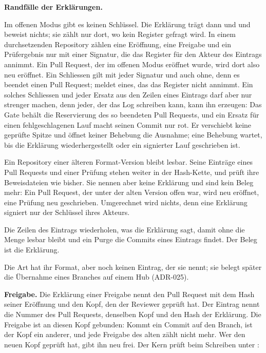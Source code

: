 \startinfobox
{\bf Randfälle der Erklärungen.}
\startitemize
\item Im offenen Modus gibt es keinen Schlüssel. Die Erklärung trägt dann  und
 und beweist nichts; sie zählt nur dort, wo kein Register gefragt wird.
In einem durchsetzenden Repository zählen eine Eröffnung, eine Freigabe und ein Prüfergebnis nur
mit einer Signatur, die das Register für den Akteur des Eintrags annimmt.
Ein Pull Request, der im offenen Modus eröffnet wurde, wird dort also neu eröffnet.
Ein Schliessen gilt mit jeder Signatur und auch ohne, denn es beendet einen Pull Request;
 meldet eines, das das Register nicht annimmt.
Ein solches Schliessen und jeder Ersatz aus den Zeilen eines Eintrags darf aber nur strenger
machen, denn jeder, der das Log schreiben kann, kann ihn erzeugen: Das Gate behält die
Reservierung des so beendeten Pull Requests, und ein Ersatz für einen fehlgeschlagenen Lauf
macht seinen Commit nur rot.
Er verschiebt keine geprüfte Spitze und öffnet keiner Behebung die Ausnahme; eine Behebung wartet,
bis die Erklärung wiederhergestellt oder ein signierter Lauf geschrieben ist.
\item Ein Repository einer älteren Format-Version bleibt lesbar. Seine Einträge eines Pull
Requests und einer Prüfung stehen weiter in der Hash-Kette, und  prüft ihre
Beweisdateien wie bisher. Sie nennen aber keine Erklärung und sind kein Beleg mehr: Ein Pull
Request, der unter der alten Version offen war, wird neu eröffnet, eine Prüfung neu geschrieben.
Umgerechnet wird nichts, denn eine Erklärung signiert nur der Schlüssel ihres Akteurs.
\item Die Zeilen des Eintrags wiederholen, was die Erklärung sagt, damit  ohne die
Menge lesbar bleibt und ein Purge die Commits eines Eintrags findet. Der Beleg ist die Erklärung.
\item Die Art  hat ihr Format, aber noch keinen Eintrag, der sie nennt;
sie belegt später die Übernahme eines Branches auf einem Hub (ADR-025).
\stopitemize
\stopinfobox

{\bf Freigabe.}
Die Erklärung einer Freigabe nennt den Pull Request mit dem Hash seiner Eröffnung und den Kopf,
den der Reviewer geprüft hat.
Der Eintrag  nennt die Nummer des Pull Requests, denselben Kopf und den Hash der
Erklärung.
Die Freigabe ist an diesen Kopf gebunden: Kommt ein Commit auf den Branch, ist der Kopf ein
anderer, und jede Freigabe des alten zählt nicht mehr.
Wer den neuen Kopf geprüft hat, gibt ihn neu frei.
Der Kern prüft beim Schreiben unter :

